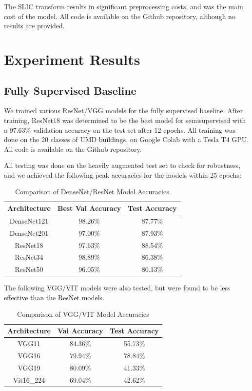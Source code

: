 \documentclass{article}
\begin{document}
The SLIC transform results in significant preprocessing costs, and was the main cost of the model. All code is available on the Github repository, although no results are provided.

\section{Experiment Results}
\label{result}

\subsection{Fully Supervised Baseline}

We trained various ResNet/VGG models for the fully supervised baseline. After training, ResNet18 was determined to be the best model for semisupervised with a 97.63\% validation accuracy on the test set after 12 epochs. All training was done on the 20 classes of UMD buildings, on Google Colab with a Tesla T4 GPU. All code is available on the Github repository.

All testing was done on the heavily augmented test set to check for robustness, and we achieved the following peak accuracies for the models within 25 epochs:

\begin{table}[H]
    \centering
    \begin{tabular}{|c|c|c|}
        \hline
        Architecture & Best Val Accuracy & Test Accuracy \\
        \hline
        DenseNet121 & 98.26\% & 87.77\% \\
        \hline
        DenseNet201 & 97.00\% & 87.93\% \\
        \hline
        ResNet18 & 97.63\% & 88.54\% \\
        \hline
        ResNet34 & 98.89\% & 86.38\% \\
        \hline
        ResNet50 & 96.05\% & 80.13\% \\
        \hline
    \end{tabular}
    \caption{Comparison of DenseNet/ResNet Model Accuracies}
    \label{tab:dnrn_model_accuracies}
\end{table}

The following VGG/VIT models were also tested, but were found to be less effective than the ResNet models.

\begin{table}[H]
    \centering
    \begin{tabular}{|c|c|c|}
        \hline
        Architecture & Val Accuracy & Test Accuracy \\
        \hline
        VGG11 & 84.36\% & 55.73\% \\
        \hline
        VGG16 & 79.94\% & 78.84\% \\
        \hline
        VGG19 & 80.09\% & 41.33\% \\
        \hline
        Vit16\_224 & 69.04\% & 42.62\% \\
        \hline
    \end{tabular}
    \caption{Comparison of VGG/VIT Model Accuracies}
    \label{tab:vgg_model_accuracies}
\end{table}
\end{document}
